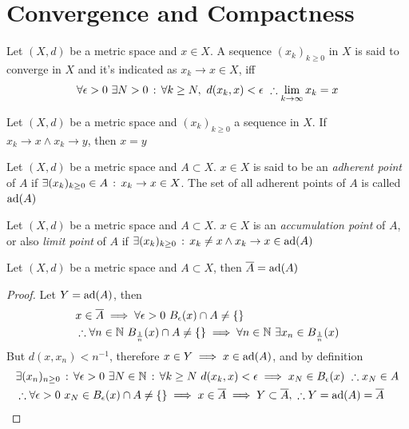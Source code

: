 \documentclass[../complete.tex]{subfiles}
\begin{document}
\section{Convergence and Compactness}
\begin{dfn}[Convergence]
	Let $(X,d)$ be a metric space and $x\in X$. A sequence $(x_k)_{k\ge0}$ in $X$ is said to converge in $X$ and it's indicated as $x_k\to x\in X$, iff
	\begin{equation*}
		\forall\epsilon>0\ \exists N>0\st\forall k\ge N,\ d(x_k,x)<\epsilon\ \therefore\lim_{k\to\infty}x_k=x
	\end{equation*}
\end{dfn}
\begin{thm}
	Let $(X,d)$ be a metric space and $(x_k)_{k\ge0}$ a sequence in $X$. If $x_k\to x\wedge x_k\to y$, then $x=y$
\end{thm}
\begin{dfn}
	Let $(X,d)$ be a metric space and $A\subset X$. $x\in X$ is said to be an \textit{adherent point} of $A$ if $\exists(x_k)_{k\ge0}\in A\, :\,  x_k\to x\in X$. The set of all adherent points of $A$ is called $\operatorname{ad}(A)$
\end{dfn}
\begin{dfn}
	Let $(X,d)$ be a metric space and $A\subset X$. $x\in X$ is an \textit{accumulation point} of $A$, or also \textit{limit point} of $A$ if $\exists(x_k)_{k\ge0}\, :\,  x_k\ne x\wedge x_k\to x\in\operatorname{ad}(A)$
\end{dfn}
\begin{prop}
	Let $(X,d)$ be a metric space and $A\subset X$, then $\overline{A}=\operatorname{ad}(A)$
\end{prop}
\begin{proof}
	Let $Y=\operatorname{ad}(A)$, then
	\begin{equation*}
		\begin{aligned}
			&x\in\cc{A}\implies{}\forall\epsilon>0\ B_\epsilon(x)\cap A\ne\{\}\\
			&\therefore\forall n\in\N\ B_{\frac{1}{n}}(x)\cap A\ne\{\}\implies{}\forall n\in\N\ \exists x_n\in B_{\frac{1}{n}}(x)
		\end{aligned}
	\end{equation*}
	But $d(x,x_n)<n^{-1}$, therefore $x\in Y\implies{} x\in\operatorname{ad}(A)$, and by definition
	\begin{equation*}
		\begin{aligned}
			&\exists(x_n)_{n\ge0}\, :\, \forall\epsilon>0\ \exists N\in\mathbb{N}\, :\, \forall k\ge N\ d(x_k,x)<\epsilon\implies{} x_N\in B_\epsilon(x)\ \therefore x_N\in A\\
			&\therefore\forall\epsilon>0\ x_N\in B_\epsilon(x)\cap A\ne\{\}\implies{} x\in\overline{A}\implies{} Y\subset\overline{A},\ \therefore Y=\operatorname{ad}(A)=\overline{A}
		\end{aligned}
	\end{equation*}
\end{proof}
\end{document}
